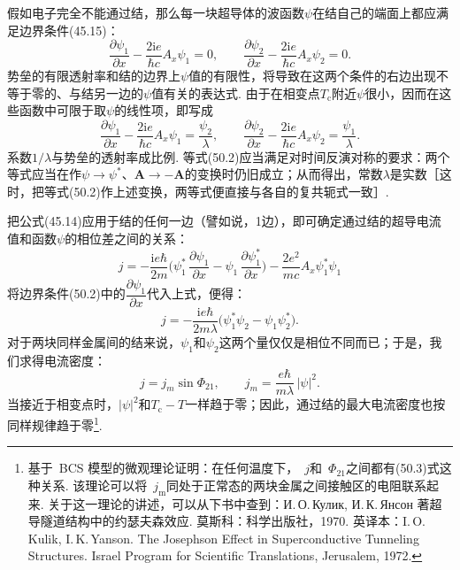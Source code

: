 假如电子完全不能通过结，那么每一块超导体的波函数$\psi$在结自己的端面上都应满足边界条件(45.15)：
\begin{equation*}
\frac{\partial\psi_1}{\partial x}-\frac{2\mathrm{i}e}{\hbar c}A_x\psi_1=0,
\qquad
\frac{\partial\psi_2}{\partial x}-\frac{2\mathrm{i}e}{\hbar c}A_x\psi_2=0.
\end{equation*}
势垒的有限透射率和结的边界上$\psi$值的有限性，将导致在这两个条件的右边出现不等于零的、与结另一边的$\psi$值有关的表达式. 由于在相变点$T_{\mathrm{c}}$附近$\psi$很小，因而在这些函数中可限于取$\psi$的线性项，即写成
\begin{equation}
\frac{\partial\psi_1}{\partial x}-\frac{2\mathrm{i}e}{\hbar c}A_x\psi_1=\frac{\psi_2}{\lambda},
\qquad
\frac{\partial\psi_2}{\partial x}-\frac{2\mathrm{i}e}{\hbar c}A_x\psi_2=\frac{\psi_1}{\lambda}.
\end{equation}
系数$1/\lambda$与势垒的透射率成比例. 等式(50.2)应当满足对时间反演对称的要求：两个等式应当在作$\psi\to\psi^*$、$\bm{A}\to-\bm{A}$的变换时仍旧成立；从而得出，常数$\lambda$是实数［这时，把等式(50.2)作上述变换，两等式便直接与各自的复共轭式一致］.

把公式(45.14)应用于结的任何一边（譬如说，1边），即可确定通过结的超导电流值和函数$\psi$的相位差之间的关系：
\begin{equation*}
j=-\frac{\mathrm{i}e\hbar}{2m}
\biggl(\psi_1^*\,\frac{\partial\psi_1}{\partial x}
-\psi_1\,\frac{\partial\psi_1^*}{\partial x}\biggr)
-\frac{2e^2}{mc}A_x\psi_1^*\psi_1
\end{equation*}
将边界条件(50.2)中的$\dfrac{\partial\psi_1}{\partial x}$代入上式，便得：
\begin{equation*}
j=-\frac{\mathrm{i}e\hbar}{2m\lambda}\bigl(\psi_1^*\psi_2-\psi_1\psi_2^*\bigr).
\end{equation*}
对于两块同样金属间的结来说，$\psi_1$和$\psi_2$这两个量仅仅是相位不同而已；于是，我们求得电流密度：
\begin{equation}
j=j_m\sin\Phi_{21},\qquad
j_m=\frac{e\hbar}{m\lambda}\,|\psi|^2.
\end{equation}
当接近于相变点时，$|\psi|^2$和$T_{\mathrm{c}}-T$一样趋于零；因此，通过结的最大电流密度也按同样规律趋于零\footnote{基于~BCS 模型的微观理论证明：在任何温度下，~$j$和~$\Phi_{21}$之间都有(50.3)式这种关系. 该理论可以将~$j_{\mathrm m}$同处于正常态的两块金属之间接触区的电阻联系起来. 关于这一理论的讲述，可以从下书中查到：И.\,О.\,Кулик, И.\,К.\,Янсон 著超导隧道结构中的约瑟夫森效应. 莫斯科：科学出版社，1970. 英译本：I.\,O.\,Kulik, I.\,K.\,Yanson. The Josephson Effect in Superconductive Tunneling Structures. Israel Program for Scientific Translations, Jerusalem, 1972.}.

